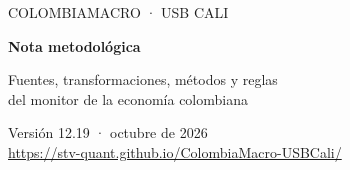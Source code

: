 \documentclass[11pt,a4paper]{article}
\begin{document}
\begin{titlepage}
\centering\vspace*{3cm}
{\sffamily\color{cmblue}\large COLOMBIAMACRO · USB CALI\par}\vspace{1.2cm}
{\sffamily\bfseries\fontsize{34}{40}\selectfont Nota metodológica\par}\vspace{0.6cm}
{\sffamily\Large Fuentes, transformaciones, métodos y reglas\\del monitor de la economía colombiana\par}
\vfill
{\sffamily\small\color{cmmuted}Versión 12.19 · octubre de 2026\\ \url{https://stv-quant.github.io/ColombiaMacro-USBCali/}\par}
\end{titlepage}
\tableofcontents\clearpage

\end{document}
